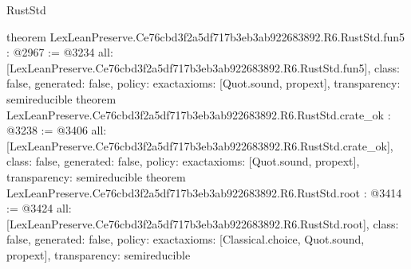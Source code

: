 \begin{lexlean}{RustStd}
\begin{coremodule}
{}
theorem LexLeanPreserve.Ce76cbd3f2a5df717b3eb3ab922683892.R6.RustStd.fun5 : @2967 := @3234 {
  all: [LexLeanPreserve.Ce76cbd3f2a5df717b3eb3ab922683892.R6.RustStd.fun5],
  class: false,
  generated: false,
  policy: exact{axioms: [Quot.sound, propext]},
  transparency: semireducible
}
theorem LexLeanPreserve.Ce76cbd3f2a5df717b3eb3ab922683892.R6.RustStd.crate_ok : @3238 := @3406 {
  all: [LexLeanPreserve.Ce76cbd3f2a5df717b3eb3ab922683892.R6.RustStd.crate_ok],
  class: false,
  generated: false,
  policy: exact{axioms: [Quot.sound, propext]},
  transparency: semireducible
}
theorem LexLeanPreserve.Ce76cbd3f2a5df717b3eb3ab922683892.R6.RustStd.root : @3414 := @3424 {
  all: [LexLeanPreserve.Ce76cbd3f2a5df717b3eb3ab922683892.R6.RustStd.root],
  class: false,
  generated: false,
  policy: exact{axioms: [Classical.choice, Quot.sound, propext]},
  transparency: semireducible
}


\end{coremodule}
\end{lexlean}
